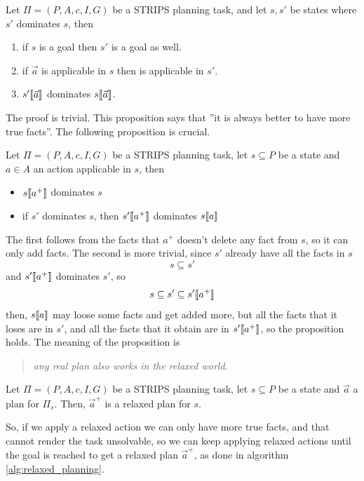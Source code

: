 \documentclass[10pt, letterpaper]{report}
\begin{document}
\begin{proposition}
    Let $\Pi=(P,A,c,I,G)$ be a STRIPS planning task, and let $s,s'$ be states where $s'$ dominates $s$, then\begin{enumerate}
        \item if $s$ is a goal then $s'$ is a goal as well. 
        \item if $\vec a$ is applicable in $s$ then is applicable in $s'$. 
        \item $s'\llbracket \vec a \rrbracket$ dominates $s\llbracket \vec a \rrbracket$.
    \end{enumerate}
\end{proposition}
The proof is trivial. This proposition says that ''it is  always better to have more true facts''. The following proposition is crucial.\begin{proposition}
     Let $\Pi=(P,A,c,I,G)$ be a STRIPS planning task, let $s\subseteq P$ be a state and $a\in A$ an action applicable in $s$, then\begin{itemize}
        \item $s\llbracket a^+ \rrbracket$ dominates $s$
        \item if $s'$ dominates $s$, then $s'\llbracket a^+ \rrbracket$ dominates  $s\llbracket a \rrbracket$
     \end{itemize}
\end{proposition}
The first follows from the facts that $a^+$ doesn't delete any fact from $s$, so it can only add facts. The second is more trivial, since $s'$ already have all the facts in $s$
$$ s\subseteq s'$$
and $s'\llbracket a^+ \rrbracket$ dominates $s'$, so 
$$s\subseteq s'\subseteq  s'\llbracket a^+ \rrbracket$$
then, $s\llbracket a \rrbracket$ may loose some facts and get added more, but all the facts that it loses are in $s'$, and all the facts that it obtain are in $s'\llbracket a^+ \rrbracket$, so the proposition holds. The meaning of the proposition is\begin{quotation}
    \textit{any real plan also works in the relaxed world.}
\end{quotation}

\begin{proposition}
    Let $\Pi=(P,A,c,I,G)$ be a STRIPS planning task, let $s\subseteq P$ be a state and $\vec a$ a plan for $\Pi_s$. Then, $\vec a^+$ is a relaxed plan for $s$.
\end{proposition}
So, if we apply a relaxed action we can only have more true facts, and that cannot render the task unsolvable, so we can keep applying relaxed actions until the goal is reached to get a relaxed plan $\vec a^+$, as done in algorithm \ref{alg:relaxed_planning}.
\end{document}
